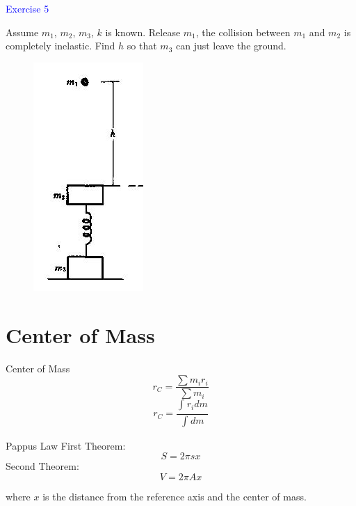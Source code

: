\documentclass{beamer}
\begin{document}
\begin{frame}
\textcolor{blue}{Exercise 5}

Assume $m_1$, $m_2$, $m_3$, $k$ is known. Release $m_1$, the collision between $m_1$ and $m_2$ is completely inelastic. Find $h$ so that $m_3$
can just leave the ground.
\begin{figure}[htbp]
\centering
\includegraphics[width=0.2 \linewidth, angle =0]{ex5.png}
\label{fig:5}
\end{figure}

\end{frame}

\section{Center of Mass}
\begin{frame}
  \begin{block}{Center of Mass}
    $$r_C = \frac{\sum m_ir_i}{\sum m_i}$$ 
    $$ r_C = \frac{\int_{}^{} r_i dm}{\int_{}^{} dm}$$
  \end{block}\pause
  \begin{block}{Pappus Law}
    First Theorem: $$S = 2\pi sx$$
    Second Theorem: $$V = 2\pi Ax$$
  \end{block}
  where $x$ is the distance from the reference axis and the center of mass.
  
\end{frame}
\end{document}
